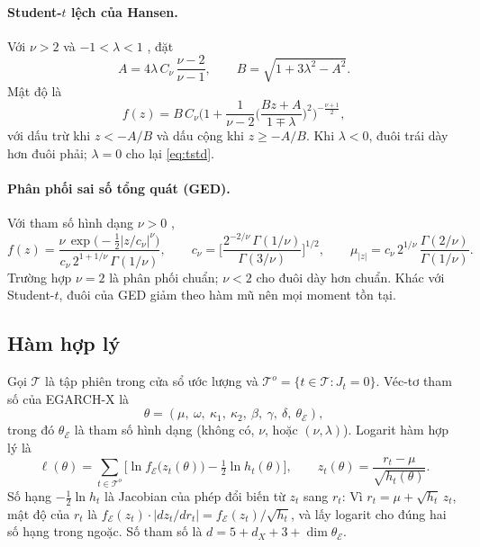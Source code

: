 \documentclass[12pt,a4paper]{article}
\theoremstyle{definition}
\theoremstyle{remark}
\newcommand{\Ecal}{\mathcal{E}}
\begin{document}
\paragraph{Student-$t$ lệch của Hansen.} Với $\nu>2$ và $-1<\lambda<1$ \cite{hansen1994}, đặt
\begin{equation}
A=4\lambda\,C_\nu\,\frac{\nu-2}{\nu-1},\qquad B=\sqrt{1+3\lambda^2-A^2}.
\end{equation}
Mật độ là
\begin{equation}\label{eq:skt}
f(z)=B\,C_\nu\Big(1+\frac{1}{\nu-2}\Big(\frac{Bz+A}{1\mp\lambda}\Big)^2\Big)^{-\frac{\nu+1}{2}},
\end{equation}
với dấu trừ khi $z<-A/B$ và dấu cộng khi $z\ge-A/B$. Khi $\lambda<0$, đuôi trái dày hơn đuôi phải; $\lambda=0$ cho lại \eqref{eq:tstd}.

\paragraph{Phân phối sai số tổng quát (GED).} Với tham số hình dạng $\nu>0$ \cite{nelson1991},
\begin{equation}\label{eq:ged}
f(z)=\frac{\nu\,\exp\big(-\tfrac12|z/c_\nu|^{\nu}\big)}{c_\nu\,2^{1+1/\nu}\,\Gamma(1/\nu)},\qquad
c_\nu=\Big[\frac{2^{-2/\nu}\,\Gamma(1/\nu)}{\Gamma(3/\nu)}\Big]^{1/2},\qquad
\mu_{|z|}=c_\nu\,2^{1/\nu}\,\frac{\Gamma(2/\nu)}{\Gamma(1/\nu)} .
\end{equation}
Trường hợp $\nu=2$ là phân phối chuẩn; $\nu<2$ cho đuôi dày hơn chuẩn. Khác với Student-$t$, đuôi của GED giảm theo hàm mũ nên mọi moment tồn tại.

\subsection{Hàm hợp lý}

Gọi $\mathcal T$ là tập phiên trong cửa sổ ước lượng và $\mathcal T^{o}=\{t\in\mathcal T: J_t=0\}$. Véc-tơ tham số của EGARCH-X là
\begin{equation*}
\theta=(\mu,\ \omega,\ \kappa_1,\ \kappa_2,\ \beta,\ \gamma,\ \delta,\ \theta_{\mathcal E}),
\end{equation*}
trong đó $\theta_{\mathcal E}$ là tham số hình dạng (không có, $\nu$, hoặc $(\nu,\lambda)$). Logarit hàm hợp lý là
\begin{equation}\label{eq:loglik}
\ell(\theta)=\sum_{t\in\mathcal T^{o}}\Big[\ln f_\Ecal\big(z_t(\theta)\big)-\tfrac12\ln h_t(\theta)\Big],\qquad z_t(\theta)=\frac{r_t-\mu}{\sqrt{h_t(\theta)}} .
\end{equation}
Số hạng $-\tfrac12\ln h_t$ là Jacobian của phép đổi biến từ $z_t$ sang $r_t$: Vì $r_t=\mu+\sqrt{h_t}\,z_t$, mật độ của $r_t$ là $f_\Ecal(z_t)\cdot|dz_t/dr_t|=f_\Ecal(z_t)/\sqrt{h_t}$, và lấy logarit cho đúng hai số hạng trong ngoặc. Số tham số là $d=5+d_X+3+\dim\theta_{\mathcal E}$.
\end{document}
